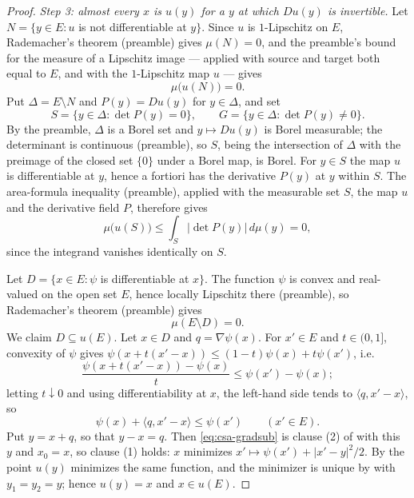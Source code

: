 \begin{proof}
\emph{Step 3: almost every $x$ is $u(y)$ for a $y$ at which $Du(y)$ is
invertible.}
Let $N=\{y\in E:u$ is not differentiable at $y\}$. Since $u$ is $1$-Lipschitz on
$E$, Rademacher's theorem (preamble) gives $\mu(N)=0$, and the preamble's bound
for the measure of a Lipschitz image --- applied with source and target both
equal to $E$, and with the $1$-Lipschitz map $u$ --- gives
\begin{equation}\label{eq:csa-uN}
  \mu\bigl(u(N)\bigr)=0 .
\end{equation}
Put $\Delta=E\setminus N$ and $P(y)=Du(y)$ for $y\in\Delta$, and set
\[
  S=\{y\in\Delta:\det P(y)=0\},\qquad G=\{y\in\Delta:\det P(y)\ne0\}.
\]
By the preamble, $\Delta$ is a Borel set and $y\mapsto Du(y)$ is Borel
measurable; the determinant is continuous (preamble), so $S$, being the
intersection of $\Delta$ with the preimage of the closed set $\{0\}$ under a
Borel map, is Borel. For $y\in S$ the map $u$ is differentiable at $y$, hence a
fortiori has the derivative $P(y)$ at $y$ within $S$. The area-formula
inequality (preamble), applied with the measurable set $S$, the map $u$ and the
derivative field $P$, therefore gives
\begin{equation}\label{eq:csa-uS}
  \mu\bigl(u(S)\bigr)\le\int_S\bigl|\det P(y)\bigr|\,d\mu(y)=0,
\end{equation}
since the integrand vanishes identically on $S$.

Let $D=\{x\in E:\psi$ is differentiable at $x\}$. The function $\psi$ is convex
and real-valued on the open set $E$, hence locally Lipschitz there (preamble),
so Rademacher's theorem (preamble) gives
\begin{equation}\label{eq:csa-D}
  \mu(E\setminus D)=0 .
\end{equation}
We claim $D\subseteq u(E)$. Let $x\in D$ and $q=\nabla\psi(x)$. For $x'\in E$ and
$t\in(0,1]$, convexity of $\psi$ gives
$\psi(x+t(x'-x))\le(1-t)\psi(x)+t\psi(x')$, i.e.
\[
  \frac{\psi(x+t(x'-x))-\psi(x)}{t}\le\psi(x')-\psi(x);
\]
letting $t\downarrow0$ and using differentiability at $x$, the left-hand side
tends to $\langle q,x'-x\rangle$, so
\begin{equation}\label{eq:csa-gradsub}
  \psi(x)+\langle q,x'-x\rangle\le\psi(x')\qquad(x'\in E).
\end{equation}
Put $y=x+q$, so that $y-x=q$. Then \eqref{eq:csa-gradsub} is clause (2) of
 with this $y$ and $x_0=x$, so clause (1) holds:
$x$ minimizes $x'\mapsto\psi(x')+|x'-y|^2/2$. By  the
point $u(y)$ minimizes the same function, and the minimizer is unique by
 with $y_1=y_2=y$; hence $u(y)=x$ and $x\in u(E)$.


\end{proof}
